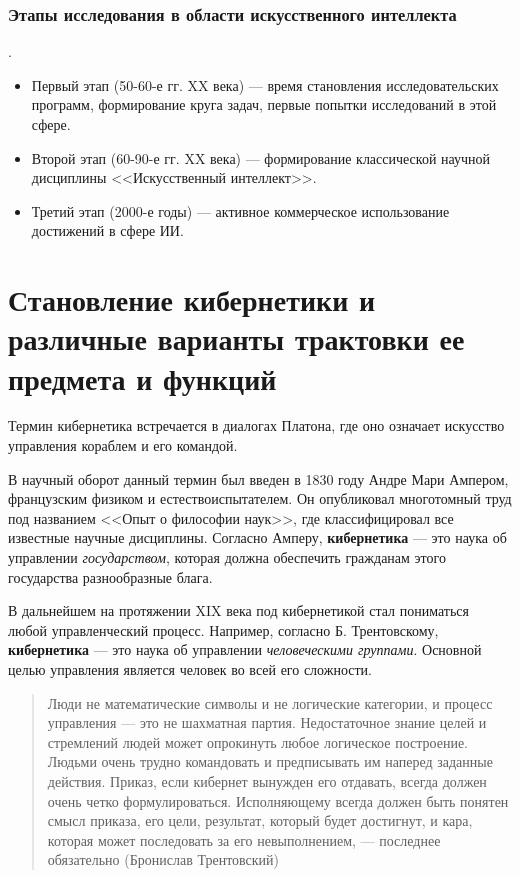\subsubsection{Этапы исследования в области искусственного интеллекта}. 
\begin{itemize}
    \item Первый этап (50-60-е гг. XX века) --- время становления исследовательских программ, формирование круга задач, первые попытки исследований в этой сфере.
    \item Второй этап (60-90-е гг. XX века) --- формирование классической научной дисциплины <<Искусственный интеллект>>.
    \item Третий этап (2000-е годы) --- активное коммерческое использование достижений в сфере ИИ.
\end{itemize}

\section[Становление кибернетики, ее предмет и функции]{Становление кибернетики и различные варианты трактовки ее предмета и функций}

Термин кибернетика встречается в диалогах Платона, где оно означает искусство управления кораблем и его командой. 

В научный оборот данный термин был введен в 1830 году Андре Мари Ампером, французским физиком и естествоиспытателем. Он опубликовал многотомный труд под названием <<Опыт о философии наук>>, где классифицировал все известные научные дисциплины. Согласно Амперу, \textbf{кибернетика} --- это наука об управлении \textit{государством}, которая должна обеспечить гражданам этого государства разнообразные блага. 

В дальнейшем на протяжении XIX века под кибернетикой стал пониматься любой управленческий процесс. Например, согласно Б. Трентовскому, \textbf{кибернетика} --- это наука об управлении \textit{человеческими группами}. Основной целью управления является человек во всей его сложности.  

\begin{quote}
Люди не математические символы и не логические категории, и процесс управления — это не шахматная партия. Недостаточное знание целей и стремлений людей может опрокинуть любое логическое построение. Людьми очень трудно командовать и предписывать им наперед заданные действия. Приказ, если кибернет вынужден его отдавать, всегда должен очень четко формулироваться. Исполняющему всегда должен быть понятен смысл приказа, его цели, результат, который будет достигнут, и кара, которая может последовать за его невыполнением, — последнее обязательно \hfill (Бронислав Трентовский)
\end{quote}

